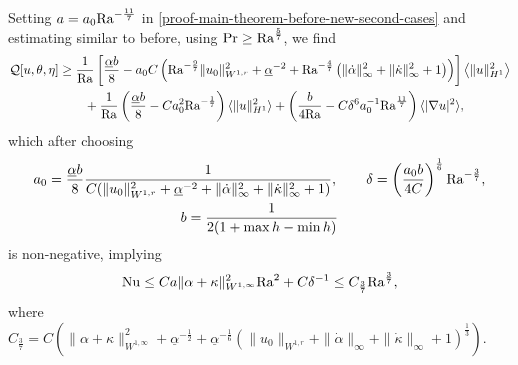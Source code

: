 \documentclass{article}
\theoremstyle{definition}
\theoremstyle{definition}
\newcommand{\Pra}{\rm{Pr}}
\newcommand{\Ra}{{\rm{Ra}}}
\newcommand{\Nu}{{\rm{Nu}}}
\begin{document}
\begin{itemize}
\begin{itemize}
                Setting $a=a_0\Ra^{-\frac{11}{7}}$ in \eqref{proof-main-theorem-before-new-second-cases} and estimating similar to before, using $\Pra\geq \Ra^\frac{5}{7}$, we find
                \begin{align*}
                    \mathcal{Q}[u,\theta,\eta]
                    &\geq \frac{1}{\Ra} \left[\frac{\underline{\alpha} b}{8} - a_0 C \left( \Ra^{-\frac{9}{7}} \|u_0\|_{W^{1,r}}^2 +  \underline{\alpha}^{-2} + \Ra^{-\frac{4}{7}} \left(\|\dot\alpha\|_\infty^2 + \|\dot\kappa\|_\infty^2 + 1\right)\right)\right]\left\langle\|u\|_{H^1}^2\right\rangle
                    \\
                    &\qquad + \frac{1}{\Ra}\left(\frac{\underline{\alpha}b}{8} - C a_0^2 \Ra^{-\frac{1}{7}}\right) \langle \|u\|_{H^1}^2\rangle + \left(\frac{b}{4\Ra} - C\delta^6 a_0^{-1}\Ra^\frac{11}{7}\right)\langle |\nabla u|^2\rangle,
                \end{align*}
                which after choosing
                \begin{equation*}
                    \begin{gathered}
                    a_0 = \frac{\underline{\alpha}b}{8}\frac{1}{C(\|u_0\|_{W^{1,r}}^2+\underline{\alpha}^{-2}+ \|\dot\alpha\|_\infty^2 + \|\dot\kappa\|_\infty^2 + 1)},\qquad \delta = \left(\frac{a_0 b}{4C}\right)^\frac{1}{6} \Ra^{-\frac{3}{7}},
                    \\
                    b = \frac{1}{2(1+\max h - \min h)}
                    \end{gathered}
                \end{equation*}
                is non-negative, implying
                \begin{align*}
                    \Nu \leq C a \|\alpha+\kappa\|_{W^{1,\infty}}^2 \Ra^2 + C \delta^{-1}\leq  C_\frac{3}{7} \Ra^\frac{3}{7},
                \end{align*}
                where $C_\frac{3}{7}= C \left(\|\alpha+\kappa\|_{W^{1,\infty}}^2 + \underline{\alpha}^{-\frac{1}{2}} + \underline{\alpha}^{-\frac{1}{6}}(\|u_0\|_{W^{1,r}}+\|\dot\alpha\|_\infty+\|\dot\kappa\|_\infty+1)^\frac{1}{3}\right)$.
        \end{itemize}
\end{itemize}







\end{document}
